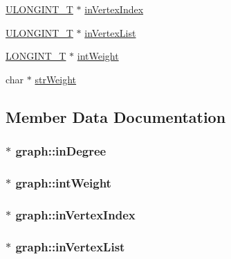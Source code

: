 \begin{DoxyCompactItemize}
\hyperlink{defs_8h_ade719b705ff384b386384c9385517e0b}{U\-L\-O\-N\-G\-I\-N\-T\-\_\-\-T} $\ast$ \hyperlink{structgraph_a8d34d717172b8cc760992a074367cad7}{in\-Vertex\-Index}
\item 
\hyperlink{defs_8h_ade719b705ff384b386384c9385517e0b}{U\-L\-O\-N\-G\-I\-N\-T\-\_\-\-T} $\ast$ \hyperlink{structgraph_ae996dddf15b6fcf1e16f5576d2ba7fcb}{in\-Vertex\-List}
\item 
\hyperlink{defs_8h_a9408c2d3d0a808675815ba4d87712087}{L\-O\-N\-G\-I\-N\-T\-\_\-\-T} $\ast$ \hyperlink{structgraph_a1b7e56639d5cb56736aaa105a3523117}{int\-Weight}
\item 
char $\ast$ \hyperlink{structgraph_adb85d57b426e86162998d32f6e065a90}{str\-Weight}
\end{DoxyCompactItemize}


\subsection{Member Data Documentation}
\hypertarget{structgraph_aa64803721adead49b996cf62d7e18d4a}{
\subsubsection[{in\-Degree}]{$\ast$ graph\-::in\-Degree}}\label{structgraph_aa64803721adead49b996cf62d7e18d4a}
\hypertarget{structgraph_a1b7e56639d5cb56736aaa105a3523117}{
\subsubsection[{int\-Weight}]{$\ast$ graph\-::int\-Weight}}\label{structgraph_a1b7e56639d5cb56736aaa105a3523117}
\hypertarget{structgraph_a8d34d717172b8cc760992a074367cad7}{
\subsubsection[{in\-Vertex\-Index}]{$\ast$ graph\-::in\-Vertex\-Index}}\label{structgraph_a8d34d717172b8cc760992a074367cad7}
\hypertarget{structgraph_ae996dddf15b6fcf1e16f5576d2ba7fcb}{
\subsubsection[{in\-Vertex\-List}]{$\ast$ graph\-::in\-Vertex\-List}}\label{structgraph_ae996dddf15b6fcf1e16f5576d2ba7fcb}
